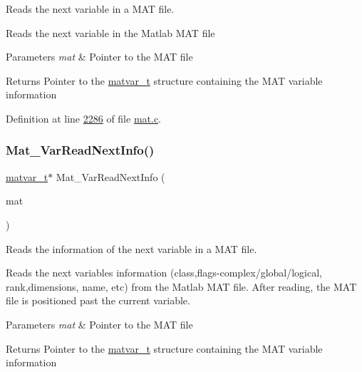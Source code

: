 Reads the next variable in a M\+AT file. 

Reads the next variable in the Matlab M\+AT file


\begin{DoxyParams}{Parameters}
{\em mat} & Pointer to the M\+AT file \\
\hline
\end{DoxyParams}
\begin{DoxyReturn}{Returns}
Pointer to the \hyperlink{group___m_a_t_structmatvar__t}{matvar\+\_\+t} structure containing the M\+AT variable information 
\end{DoxyReturn}


Definition at line \hyperlink{mat_8c_source_l02286}{2286} of file \hyperlink{mat_8c_source}{mat.\+c}.

\mbox{\label{group___m_a_t_ga72dd99330507b17177e22f9ed3bea5e6}} 
\subsubsection{\texorpdfstring{Mat\+\_\+\+Var\+Read\+Next\+Info()}{Mat\_VarReadNextInfo()}}
{\footnotesize\ttfamily \hyperlink{group___m_a_t_structmatvar__t}{matvar\+\_\+t}$\ast$ Mat\+\_\+\+Var\+Read\+Next\+Info (\begin{DoxyParamCaption}\item[{\hyperlink{group___m_a_t_gab0fc888f5a5d79943b16284b1f91c2e8}{mat\+\_\+t} $\ast$}]{mat }\end{DoxyParamCaption})}



Reads the information of the next variable in a M\+AT file. 

Reads the next variable\textquotesingle{}s information (class,flags-\/complex/global/logical, rank,dimensions, name, etc) from the Matlab M\+AT file. After reading, the M\+AT file is positioned past the current variable.


\begin{DoxyParams}{Parameters}
{\em mat} & Pointer to the M\+AT file \\
\hline
\end{DoxyParams}
\begin{DoxyReturn}{Returns}
Pointer to the \hyperlink{group___m_a_t_structmatvar__t}{matvar\+\_\+t} structure containing the M\+AT variable information 
\end{DoxyReturn}


